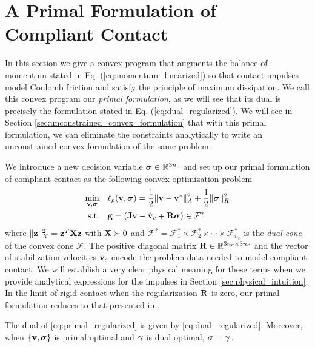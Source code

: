 
\section{A Primal Formulation of Compliant Contact}
\label{sec:primal_formulation}

In this section we give a convex program that augments the balance of momentum
stated in Eq. (\ref{eq:momentum_linearized}) so that contact impulses model
Coulomb friction and satisfy the principle of maximum dissipation.
We call this convex program our \emph{primal formulation}, as we will see that
its dual is precisely the formulation stated in Eq.
(\ref{eq:dual_regularized}). We will see in Section
\ref{sec:unconstrained_convex_formulation} that with this primal formulation,
we can eliminate the constraints analytically to write an unconstrained convex
formulation of the same problem.

We introduce a new decision variable ${\bm{\sigma}}\in\mathbb{R}^{3n_c}$ and
set up our primal formulation of compliant contact as the following convex
optimization problem
\begin{equation}
	\begin{aligned}
	\min_{\mf{v},\bsigma} \quad & \ell_p(\mf{v},\bsigma) =
	\frac{1}{2}\Vert\mf{v}-\mf{v}^*\Vert_{A}^2 +
	\frac{1}{2} \Vert\bsigma\Vert_{R}^2\\
	\textrm{s.t.} \quad & \mf{g} = (\mf{J}\mf{v}-\hat{\mf{v}}_c + \mf{R}\bsigma) \in \mathcal{F}^*\\
	\end{aligned}
	\label{eq:primal_regularized}
\end{equation}
where $\Vert{\mathbf{z}}\Vert_X^2={\mathbf{z}}^T{\mathbf{X}}{\mathbf{z}}$ with ${\mathbf{X}}\succ 0$ and
$\mathcal{F^*}= \mathcal{F}^*_1 \times \mathcal{F}^*_2 \times \cdots \times
\mathcal{F}^*_{n_c}$ is the \emph{dual cone} of the convex cone $\mathcal{F}$.
The positive diagonal matrix ${\mathbf{R}}\in\mathbb{R}^{3n_c\times 3n_c}$ and the
vector of stabilization velocities $\hat{{\mathbf{v}}}_c$ encode the problem data
needed to model compliant contact. We will establish a very clear physical
meaning for these terms when we provide analytical expressions for the impulses
in Section \ref{sec:physical_intuition}. In the limit of rigid contact
when the regularization ${\mathbf{R}}$ is zero, our primal formulation reduces to that
presented in \cite{bib:mazhar2014}.

\begin{theorem}\label{th:primal_dual}
The dual of \eqref{eq:primal_regularized} is given by 
\eqref{eq:dual_regularized}. Moreover, when $\{{\mathbf{v}},{\bm\sigma}\}$ is primal optimal and
${\bm\gamma}$ is dual optimal, ${\bm\sigma} = {\bm\gamma}$.
\end{theorem}

